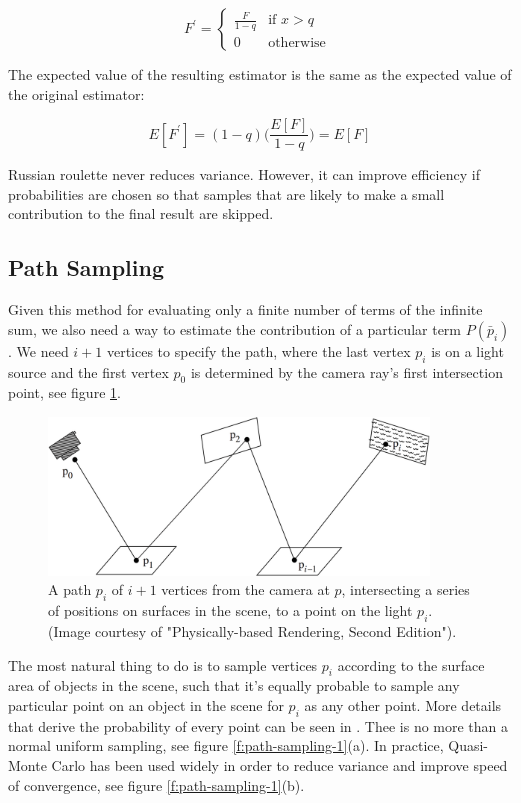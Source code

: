 \begin{equation}
	F^{'}=\begin{cases}
			\frac{F}{1-q}  & \text{if } x> q \\
			0              & \text{otherwise } 
		\end{cases}
\end{equation}

The expected value of the resulting estimator is the same as the expected value of the original estimator:

\begin{equation}
	E[F^{'}]=(1-q)\Bigg( \frac{E[F]}{1-q} \Bigg)=E[F]
\end{equation}

Russian roulette never reduces variance. However, it can improve efficiency if probabilities are chosen so that samples that are likely to make a small contribution to the final result are skipped.



\subsection{Path Sampling}
Given this method for evaluating only a finite number of terms of the infinite sum, we also need  a way to estimate the contribution of a particular term $P(\bar{p}_i)$. We need $i+1$ vertices to specify the path, where the last vertex $p_i$ is on a light source and the first vertex $p_0$ is determined by the camera ray's first intersection point, see figure \ref{f:path-sampling}.

\begin{figure}\label{f:path-sampling}
	\includegraphics[width=0.9\textwidth]{graphics/gi/path-6}
	\caption{A path $p_i$ of $i+1$ vertices from the camera at $p$, intersecting a series of positions on surfaces in the scene, to a point on the light $p_i$. (Image courtesy of "Physically-based Rendering, Second Edition").}
\end{figure}

The most natural thing to do is to sample vertices $p_i$ according to the surface area of objects in the scene, such that it's equally probable to sample any particular point on an object in the scene for $p_i$ as any other point. More details that derive the probability of every point can be seen in \cite{b:pbrt}. Thee is no more than a normal uniform sampling, see figure \ref{f:path-sampling-1}(a). In practice, Quasi-Monte Carlo has been used widely in order to reduce variance and improve speed of convergence, see figure \ref{f:path-sampling-1}(b). 

